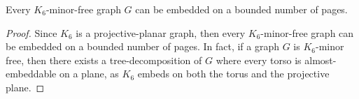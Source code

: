 \begin{corollary}
	Every $K_6$-minor-free graph $G$ can be embedded on a bounded number of pages.
\end{corollary}

\begin{proof}
	Since $K_6$ is a projective-planar graph, then every $K_6$-minor-free graph can be embedded on a bounded number of pages. In fact, if a graph $G$ is $K_6$-minor free, then there exists a tree-decomposition of $G$ where every torso is almost-embeddable on a plane, as $K_6$ embeds on both the torus and the projective plane. 
\end{proof}